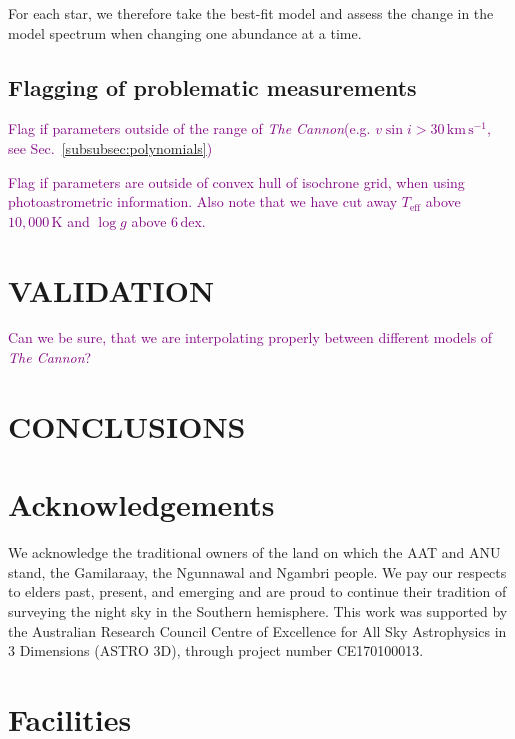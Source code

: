 \documentclass[
  journal=pasa,
  manuscript=research-paper, %
  year=2021,
  volume=37,
]{cup-journal}
\newcommand{\SB}[1]{{\textcolor{purple}{#1}}}
\newcommand{\Teff}{$T_\mathrm{eff}$\xspace}
\newcommand{\logg}{$\log g$\xspace}
\newcommand{\vsini}{$v \sin i$\xspace}
\newcommand{\TheCannon}{\textit{The Cannon}\xspace}
\newcommand{\dex}{\,\mathrm{dex}}	%
\newcommand{\K}{\,\mathrm{K}}	%
\newcommand{\kms}{\,\mathrm{km\,s^{-1}}}	%
\begin{document}
For each star, we therefore take the best-fit model and assess the change in the model spectrum when changing one abundance at a time.

\subsection{Flagging of problematic measurements}

\SB{Flag if parameters outside of the range of \TheCannon (e.g. \vsini$ > 30 \kms$, see Sec.~\ref{subsubsec:polynomials})}

\SB{Flag if parameters are outside of convex hull of isochrone grid, when using photoastrometric information. Also note that we have cut away \Teff above $10,000\K$ and \logg above $6\dex$.}

\section{VALIDATION} \label{sec:validation}

\SB{Can we be sure, that we are interpolating properly between different models of \TheCannon?}

\section{CONCLUSIONS} \label{sec:conclusion}

\section*{Acknowledgements}

We acknowledge the traditional owners of the land on which the AAT and ANU stand, the Gamilaraay, the Ngunnawal and Ngambri people. We pay our respects to elders past, present, and emerging and are proud to continue their tradition of surveying the night sky in the Southern hemisphere.
This work was supported by the Australian Research Council Centre of Excellence for All Sky Astrophysics in 3 Dimensions (ASTRO 3D), through project number CE170100013.

\section*{Facilities}
\end{document}
